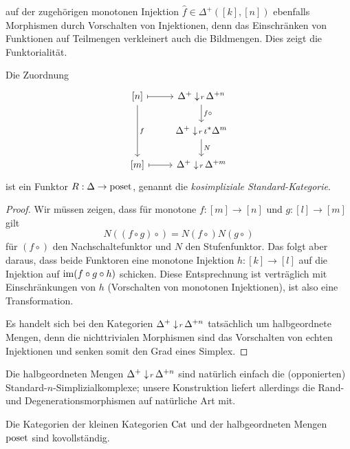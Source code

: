auf der zugehörigen monotonen Injektion $\hat{f} \in \Delta^+([k],
[n])$ ebenfalls Morphismen durch Vorschalten von Injektionen, denn das
Einschränken von Funktionen auf Teilmengen verkleinert auch die
Bildmengen. Dies zeigt die Funktorialität.
\begin{prop}
  Die Zuordnung
  \[ \begin{tikzcd}
    {[n]} \arrow{dd}{f} \rar[mapsto]
    & \slicecat{\Delta^+}{r}{\Delta^{+n}} \dar{f \circ} \\
    & \slicecat{\Delta^+}{r}{\iota^* \Delta^m} \dar{N} \\
    {[m]} \rar[mapsto]
    & \slicecat{\Delta^+}{r}{\Delta^{+m}}
  \end{tikzcd} \]
  ist ein Funktor $R: \Delta \to \operatorname{poset}$, genannt die
  \emph{kosimpliziale Standard-Kategorie}.
\end{prop}
\begin{proof}
  Wir müssen zeigen, dass für monotone $f: [m] \to [n]$ und $g: [l]
  \to [m]$ gilt
  \[ N ((f \circ g)\circ) = N (f \circ) N (g \circ) \]
  für $(f \circ)$ den Nachschaltefunktor und $N$ den
  Stufenfunktor. Das folgt aber daraus, dass beide Funktoren eine
  monotone Injektion $h: [k] \to [l]$ auf die Injektion auf $\operatorname{im} (f
  \circ g \circ h)$ schicken. Diese Entsprechnung ist verträglich mit
  Einschränkungen von $h$ (Vorschalten von monotonen Injektionen), ist
  also eine Transformation.

  Es handelt sich bei den Kategorien
  $\Delta^+ \downarrow \! {\scriptstyle r} \, \Delta^{+n}$ tatsächlich um halbgeordnete
  Mengen, denn die nichttrivialen Morphismen sind das Vorschalten von
  echten Injektionen und senken somit den Grad eines Simplex.
\end{proof}
\begin{bem}
  Die halbgeordneten Mengen $\Delta^+ \downarrow \! {\scriptstyle r} \, \Delta^{+n}$ sind
  natürlich einfach die (opponierten) Standard-$n$-Simplizialkomplexe;
  unsere Konstruktion liefert allerdings die Rand- und
  Degenerationsmorphismen auf natürliche Art mit.
\end{bem}
\begin{prop} \label{cat-cocomplete}
  Die Kategorien der kleinen Kategorien $\operatorname{Cat}$ und der halbgeordneten
  Mengen $\operatorname{poset}$ sind kovollständig.
\end{prop}
